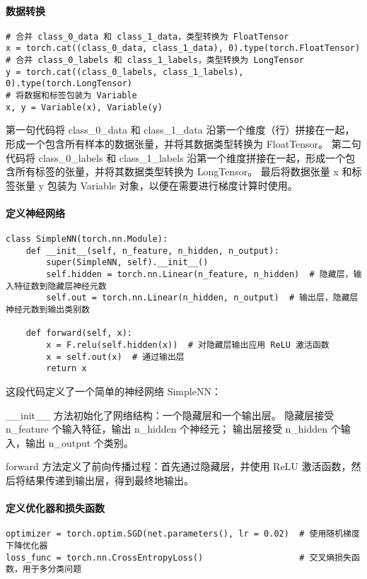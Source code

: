\documentclass[16pt]{lzc}
\begin{document}
    \paragraph{数据转换}
        \begin{verbatim}
# 合并 class_0_data 和 class_1_data，类型转换为 FloatTensor
x = torch.cat((class_0_data, class_1_data), 0).type(torch.FloatTensor)
# 合并 class_0_labels 和 class_1_labels，类型转换为 LongTensor
y = torch.cat((class_0_labels, class_1_labels), 0).type(torch.LongTensor)
# 将数据和标签包装为 Variable
x, y = Variable(x), Variable(y)
        \end{verbatim}
        第一句代码将 class\_0\_data 和 class\_1\_data 沿第一个维度（行）拼接在一起，形成一个包含所有样本的数据张量，并将其数据类型转换为 FloatTensor。
        第二句代码将 class\_0\_labels 和 class\_1\_labels 沿第一个维度拼接在一起，形成一个包含所有标签的张量，并将其数据类型转换为 LongTensor。
        最后将数据张量 x 和标签张量 y 包装为 Variable 对象，以便在需要进行梯度计算时使用。

    \paragraph{定义神经网络}
        \begin{verbatim}
class SimpleNN(torch.nn.Module):
    def __init__(self, n_feature, n_hidden, n_output):
        super(SimpleNN, self).__init__()
        self.hidden = torch.nn.Linear(n_feature, n_hidden)  # 隐藏层，输入特征数到隐藏层神经元数
        self.out = torch.nn.Linear(n_hidden, n_output)  # 输出层，隐藏层神经元数到输出类别数

    def forward(self, x):
        x = F.relu(self.hidden(x))  # 对隐藏层输出应用 ReLU 激活函数
        x = self.out(x)  # 通过输出层
        return x
        \end{verbatim}

        这段代码定义了一个简单的神经网络 SimpleNN：

        \_\_init\_\_ 方法初始化了网络结构：一个隐藏层和一个输出层。
        隐藏层接受 n\_feature 个输入特征，输出 n\_hidden 个神经元；
        输出层接受 n\_hidden 个输入，输出 n\_output 个类别。

        forward 方法定义了前向传播过程：首先通过隐藏层，并使用 ReLU 激活函数，然后将结果传递到输出层，得到最终地输出。

    \paragraph{定义优化器和损失函数}
        \begin{verbatim}
optimizer = torch.optim.SGD(net.parameters(), lr = 0.02)  # 使用随机梯度下降优化器
loss_func = torch.nn.CrossEntropyLoss()                   # 交叉熵损失函数，用于多分类问题
        \end{verbatim}
\end{document}
